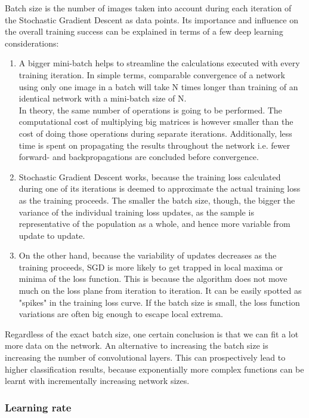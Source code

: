 \documentclass[a4paper, 12pt]{article}
\numberwithin{equation}{section}
\begin{document}
	Batch size is the number of images taken into account during each iteration of the Stochastic Gradient Descent as data points. Its importance and influence on the overall training success can be explained in terms of a few deep learning considerations:
	\begin{enumerate}
		\item A bigger mini-batch helps to streamline the calculations executed with every training iteration. In simple terms, comparable convergence of a network using only one image in a batch will take N times longer than training of an identical network with a mini-batch size of N. \\ In theory, the same number of operations is going to be performed. The computational cost of multiplying big matrices is however smaller than the cost of doing those operations during separate iterations. Additionally, less time is spent on propagating the results throughout the network i.e. fewer forward- and backpropagations are concluded before convergence.
		\item Stochastic Gradient Descent works, because the training loss calculated during one of its iterations is deemed to approximate the actual training loss as the training proceeds. The smaller the batch size, though, the bigger the variance of the individual training loss updates, as the sample is representative of the population as a whole, and hence more variable from update to update.
		\item On the other hand, because the variability of updates decreases as the training proceeds, SGD is more likely to get trapped in local maxima or minima of the loss function. This is because the algorithm does not move much on the loss plane from iteration to iteration. It can be easily spotted as "spikes" in the training loss curve. If the batch size is small, the loss function variations are often big enough to escape local extrema.
	\end{enumerate}	

	Regardless of the exact batch size, one certain conclusion is that we can fit a lot more data on the network. An alternative to increasing the batch size is increasing the number of convolutional layers. This can prospectively lead to higher classification results, because exponentially more complex functions can be learnt with incrementally increasing network sizes.
	
	\subsubsection{Learning rate}
	
\end{document}
